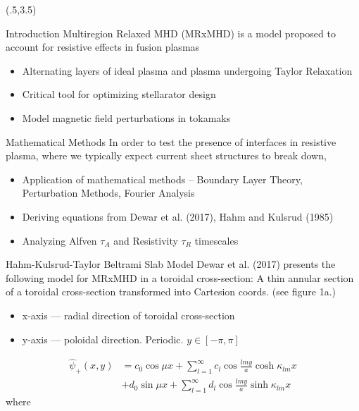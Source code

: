 \documentclass{beamer}
\begin{document}
\begin{frame}[t]
\begin{textblock}{15}(.5,3.5)
{\Large
\begin{block}{Introduction}
Multiregion Relaxed MHD (MRxMHD) is a model proposed to account for resistive effects in fusion plasmas
\begin{itemize}
    \item Alternating layers of ideal plasma and plasma undergoing Taylor Relaxation 
    \item Critical tool for optimizing stellarator design
    \item Model magnetic field perturbations in tokamaks
\end{itemize}
\end{block}

\begin{block}{Mathematical Methods}
In order to test the presence of interfaces in resistive plasma, where we typically expect current sheet structures to break down,
\begin{itemize}
    \item Application of mathematical methods -- Boundary Layer Theory, Perturbation Methods, Fourier Analysis
    \item Deriving equations from Dewar et al. (2017), Hahm and Kulsrud (1985)
    \item Analyzing Alfven $\tau_A$ and Resistivity $\tau_R$ timescales \cite{wangbhattacharjee}
\end{itemize}
\end{block}
}

\begin{block}{Hahm-Kulsrud-Taylor Beltrami Slab Model}
Dewar et al. (2017) presents the following model for MRxMHD in a toroidal cross-section:
A thin annular section of a toroidal cross-section transformed into Cartesion coords. \cite{dewar2017} (see figure 1a.)
\begin{itemize}
    \item x-axis --- radial direction of toroidal cross-section
    \item y-axis --- poloidal direction. Periodic. $y \in [-\pi,\pi]$
\end{itemize}

\begin{equation}
    \begin{split}
        \hat{\psi}_+ (x,y) & = c_0\cos{\mu x} + \sum_{l=1}^{\infty} c_{l} \cos{\frac{lmy}{a}} \cosh{\kappa_{lm} x} \\
                           & + d_0 \sin{\mu x} + \sum_{l=1}^{\infty} d_{l} \cos{\frac{lmy}{a}} \sinh{\kappa_{lm} x}
    \end{split}
\end{equation} 
where


\end{block}
\end{textblock}
\end{frame}
\end{document}
